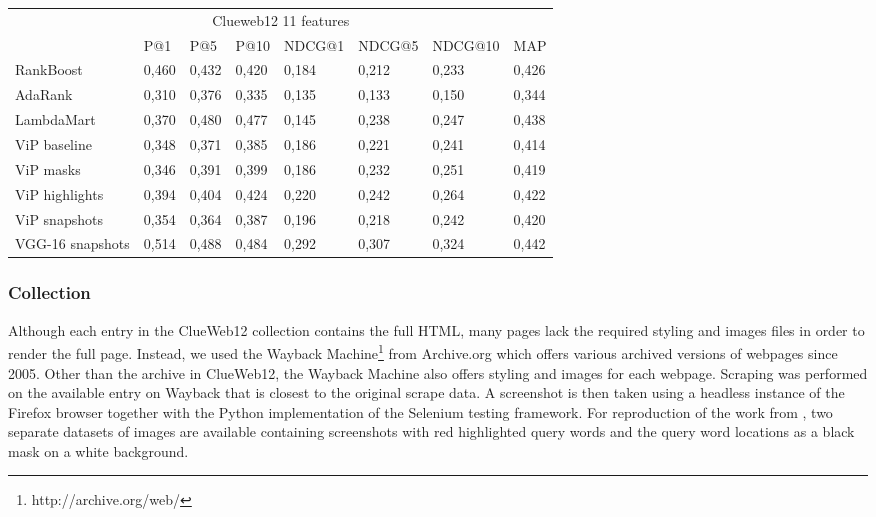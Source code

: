 \begin{table}[t]
\begin{center}
\begin{tabular}{llllllll}
\multicolumn{8}{c}{Clueweb12 11 features}                                    \\ 
                      & P@1   & P@5   & P@10  & NDCG@1 & NDCG@5 & NDCG@10 & MAP   \\ \hline
RankBoost             & 0,460 & 0,432 & 0,420 & 0,184  & 0,212  & 0,233   & 0,426 \\
AdaRank               & 0,310 & 0,376 & 0,335 & 0,135  & 0,133  & 0,150   & 0,344 \\
LambdaMart            & 0,370 & 0,480 & 0,477 & 0,145  & 0,238  & 0,247   & 0,438 \\ \hline
ViP baseline          & 0,348 & 0,371 & 0,385 & 0,186  & 0,221  & 0,241   & 0,414 \\ \hline
ViP masks             & 0,346 & 0,391 & 0,399 & 0,186  & 0,232  & 0,251   & 0,419 \\
ViP highlights        & 0,394 & 0,404 & 0,424 & 0,220  & 0,242  & 0,264   & 0,422 \\
ViP snapshots         & 0,354 & 0,364 & 0,387 & 0,196  & 0,218  & 0,242   & 0,420 \\ \hline
VGG-16 snapshots      & 0,514 & 0,488 & 0,484 & 0,292  & 0,307  & 0,324   & 0,442 \\ \hline
\end{tabular}
\centering
{}
\label{tab:results}
\end{center}
\end{table}


\subsubsection{Collection}
Although each entry in the ClueWeb12 collection contains the full HTML, many pages lack the required styling and images files in order to render the full page. Instead, we used the Wayback Machine\footnote{http://archive.org/web/} from Archive.org which offers various archived versions of webpages since 2005. Other than the archive in ClueWeb12, the Wayback Machine also offers styling and images for each webpage. Scraping was performed on the available entry on Wayback that is closest to the original scrape data. A screenshot is then taken using a headless instance of the Firefox browser together with the Python implementation of the Selenium testing framework. 
For reproduction of the work from \citet{fan2017learning}, two separate datasets of images are available containing screenshots with red highlighted query words and the query word locations as a black mask on a white background. 

